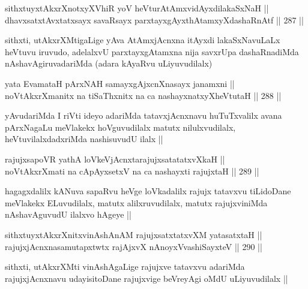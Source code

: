 \begin{shl}
sithxtuyxtAkxrXnotxyXVhiR yoV heVturAtAmxvidAyxdilakaSxNaH || \\
dhavxsatxtAvxtatxsayx savaRsayx parxtayxgAyxthAtamxyXdashaRnAtf ||  287 ||  
\end{shl}

\begin{artha}
sithxti, utAkxrXMtigaLige yAva AtAmxjAcnxna itAyxdi lakaSxNavuLaLx
heVtuvu iruvudo, adelalxvU parxtayxgAtamxna nija savxrUpa
dashaRnadiMda nAshavAgiruvadariMda (adara kAyaRvu uLiyuvudilalx)
\end{artha}

\begin{shl}
yata EvamataH pArxNAH samayxgAjxcnXnasayx janamxni || \\
noVtAkxrXmanitx na tiSaThxnitx na ca nashayxnatxyXheVtutaH ||  288 ||  
\end{shl}

\begin{artha}
yAvudariMda I riVti ideyo adariMda tatavxjAcnxnavu huTuTxvalilx avana
pArxNagaLu meVlakekx hoVguvudilalx matutx nilulxvudilalx,
heVtuvilalxdadxriMda nashisuvudU ilalx ||
\end{artha}

\begin{shl}
rajujxsapoVR yathA loVkeV\s jAcnxtarajujxsatatatxvXkaH || \\
noVtAkxrXmati na cApAyxsetxV na ca nashayxti rajujxtaH ||  289 ||  
\end{shl}

\begin{artha}
hagagxdalilx kANuva sapaRvu heVge loVkadalilx rajujx tatavxvu
tiLidoDane meVlakekx ELuvudilalx, matutx alilxruvudilalx, matutx
rajujxviniMda nAshavAguvudU ilalxvo hAgeye ||
\end{artha}

\begin{shl}
sithxtuyxtAkxrXnitxvinAshAnAM rajujxsatxtatxvXM yatasatxtaH || \\
rajujxjAcnxnasamutapxtwtx rajAjxvX nAnoyxV\s vashiSayxteV ||  290 ||  
\end{shl}

\begin{artha}
sithxti, utAkxrXMti vinAshAgaLige rajujxve tatavxvu adariMda
rajujxjAcnxnavu udayisitoDane rajujxvige beVreyAgi oMdU uLiyuvudilalx ||
\end{artha}


